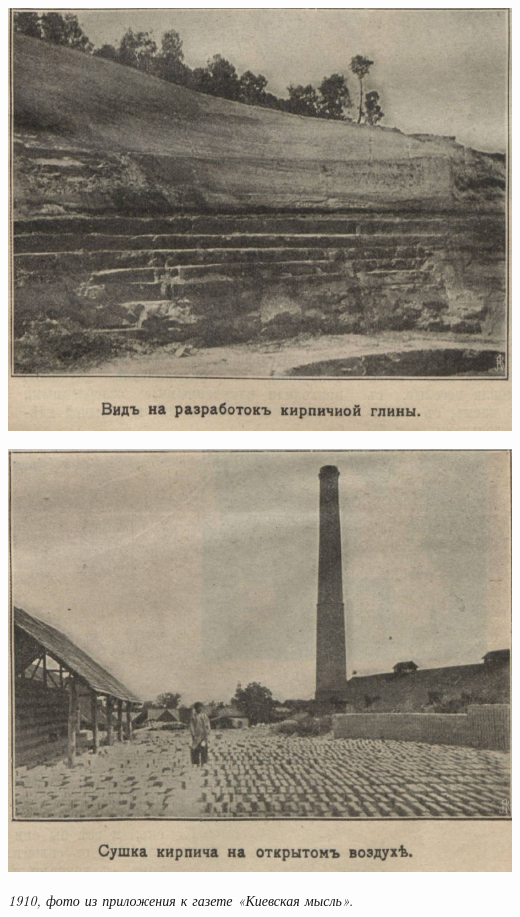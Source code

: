\begin{center}
\includegraphics[width=0.91\linewidth]{pix/1910-01.jpg}
\end{center} 


\begin{center}
\includegraphics[width=0.91\linewidth]{pix/1910-02.jpg}

\textit{1910, фото из приложения к газете «Киевская мысль».}
\end{center} 

\newpage

